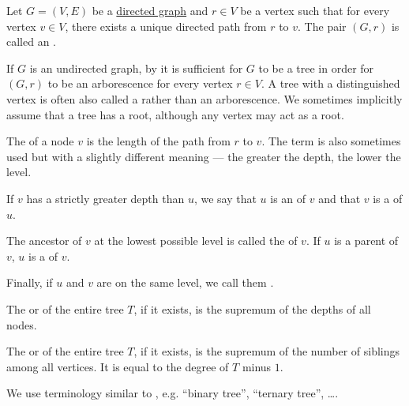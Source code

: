 \begin{definition}\label{def:arborescence}
  Let \( G = (V, E) \) be a \hyperref[def:directed_graph]{directed graph} and \( r \in V \) be a vertex such that for every vertex \( v \in V \), there exists a unique directed path from \( r \) to \( v \). The pair \( (G, r) \) is called an .

  If \( G \) is an undirected graph, by  it is sufficient for \( G \) to be a tree in order for \( (G, r) \) to be an arborescence for every vertex \( r \in V \). A tree with a distinguished vertex is often also called a  rather than an arborescence. We sometimes implicitly assume that a tree has a root, although any vertex may act as a root.

  \begin{thmenum}
     The  of a node \( v \) is the length of the path from \( r \) to \( v \). The term  is also sometimes used but with a slightly different meaning --- the greater the depth, the lower the level.

     If \( v \) has a strictly greater depth than \( u \), we say that \( u \) is an  of \( v \) and that \( v \) is a  of \( u \).

    The ancestor of \( v \) at the lowest possible level is called the  of \( v \). If \( u \) is a parent of \( v \), \( u \) is a  of \( v \).

    Finally, if \( u \) and \( v \) are on the same level, we call them .

     The  or  of the entire tree \( T \), if it exists, is the supremum of the depths of all nodes.

     The  or  of the entire tree \( T \), if it exists, is the supremum of the number of siblings among all vertices. It is equal to the degree of \( T \) minus \( 1 \).

    We use terminology similar to , e.g. \enquote{binary tree}, \enquote{ternary tree}, \ldots.
  \end{thmenum}
\end{definition}
